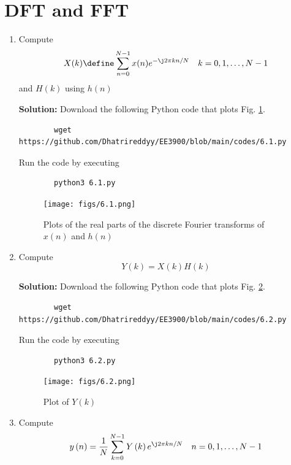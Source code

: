 \documentclass[journal,12pt,twocolumn]{IEEEtran}
\newcommand{\solution}{\noindent \textbf{Solution: }}
\providecommand{\brak}[1]{\ensuremath{\left(#1\right)}}
\numberwithin{equation}{section}
\renewcommand\thesection{\arabic{section}}
\begin{document}
	\section{DFT and FFT}
	\begin{enumerate}[label=\thesection.\arabic*]
	\item Compute
	\begin{equation}
		X(k) \define \sum _{n=0}^{N-1}x(n) e^{-\j2\pi kn/N} \quad k = 0,1,\dots, N-1
	\end{equation}
	and $H(k)$ using $h(n)$
	
	\solution Download the following Python code that plots Fig. \ref{fig-6.1}.
	\begin{lstlisting}
		wget https://github.com/Dhatrireddyy/EE3900/blob/main/codes/6.1.py
	\end{lstlisting}
	
	Run the code by executing
	\begin{lstlisting}
		python3 6.1.py
	\end{lstlisting}

	\begin{figure}[!ht]
		\centering
		\texttt{[image: figs/6.1.png]}
		\caption{Plots of the real parts of the discrete Fourier transforms of $x(n)$ and $h(n)$}
		\label{fig-6.1}	
	\end{figure}
	
	\item Compute 
	\begin{equation}
		Y(k) = X(k)H(k)
	\end{equation}
	
	\solution Download the following Python code that plots Fig. \ref{fig-6.2}.
	\begin{lstlisting}
		wget https://github.com/Dhatrireddyy/EE3900/blob/main/codes/6.2.py
	\end{lstlisting}
	
	Run the code by executing
	\begin{lstlisting}
		python3 6.2.py
	\end{lstlisting}

	\begin{figure}[!ht]
		\centering
		\texttt{[image: figs/6.2.png]}
		\caption{Plot of $Y(k)$}
		\label{fig-6.2}	
	\end{figure}

	\item Compute
	\begin{equation}
 		y\brak{n}={\frac {1}{N}}\sum _{k=0}^{N-1}Y\brak{k}e^{\j 2\pi kn/N} \quad n = 0,1,\dots, N-1
	\end{equation}
	

\end{enumerate}
\end{document}
